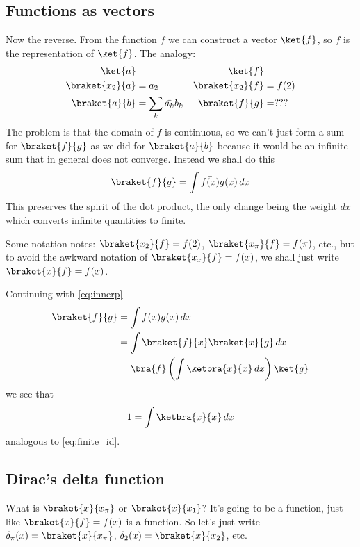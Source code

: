 \documentclass[12pt, oneside, letterpaper, fleqn]{article}
\begin{document}
\subsection{Functions as vectors}

Now the reverse. From the function $f$ we can construct a vector
$\ket{f}$, so $f$ is the representation of $\ket{f}$. The analogy:
\begin{align*}
\ket{a}& & \ket{f}&\\
\braket{x_2}{a} &= a_2 & \braket{x_2}{f} &= f(2)\\
\braket{a}{b} &= \sum_k \bar{a_k}b_k & \braket{f}{g} &= ???
\end{align*}
The problem is that the domain of $f$ is continuous, so we can't just
form a sum for $\braket{f}{g}$ as we did for $\braket{a}{b}$ because it
would be an infinite sum that in general does not converge. Instead we
shall do this
\begin{align}\label{eq:innerp}
\braket{f}{g} = \int \bar{f(x)}g(x)\,dx
\end{align}
This preserves the spirit of the dot product, the only change being the
weight $dx$ which converts infinite quantities to finite.

Some notation notes: $\braket{x_2}{f} = f(2)$, $\braket{x_\pi}{f} =
f(\pi)$, etc., but to avoid the awkward notation of $\braket{x_x}{f} =
f(x)$, we shall just write $\braket{x}{f} = f(x)$.

Continuing with \eqref{eq:innerp}
\begin{align*}
\braket{f}{g} &= \int \bar{f(x)}g(x)\,dx\\
&= \int \braket{f}{x}\braket{x}{g}\,dx\\
&= \bra{f} \left(\int \ketbra{x}{x}\,dx\right) \ket{g}
\end{align*}
we see that
\begin{align}\label{eq:inf_id}
1 = \int \ketbra{x}{x}\,dx
\end{align}
analogous to \eqref{eq:finite_id}.

\subsection{Dirac's delta function}
What is $\braket{x}{x_\pi}$ or $\braket{x}{x_1}$? It's going to be a
function, just like $\braket{x}{f} = f(x)$ is a function. So let's just
write $\delta_\pi(x) = \braket{x}{x_\pi}$, $\delta_2(x) =
\braket{x}{x_2}$, etc.
\end{document}
